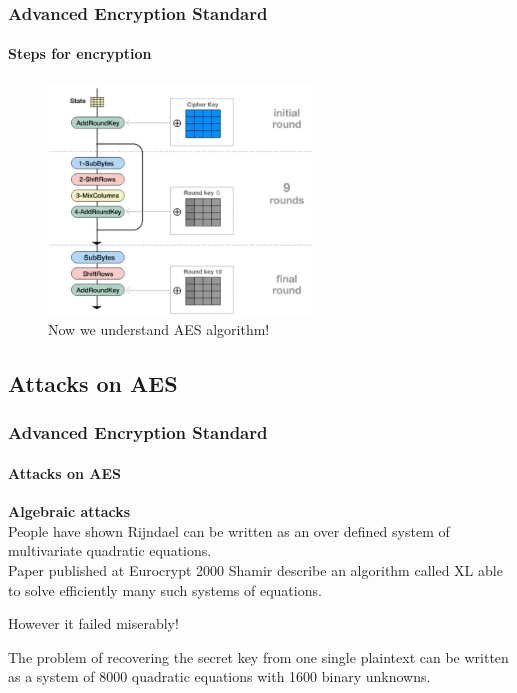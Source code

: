 \begin{frame}
	\frametitle{Advanced Encryption Standard}
		\framesubtitle{Steps for encryption}
		\vspace{-0.2cm}
	\begin{figure}
		\centering
		\includegraphics[width=7cm]{encryption}
		\caption{Now we understand AES algorithm! }
		\label{fig:obrazek encryption}
	\end{figure}
\end{frame}


\subsection{Attacks on AES} 
\begin{frame}
	\frametitle{Advanced Encryption Standard}
		\framesubtitle{Attacks on AES}
		{\normalsize
		\textbf{Algebraic attacks}\\
		\vspace{0.4cm}
		{People have shown Rijndael can be written as an over defined system of multivariate quadratic equations.}\\ 
		{Paper published at Eurocrypt 2000 Shamir describe an algorithm called XL able to solve efficiently many such systems of 					equations.}\\
		\begin{alertblock}{}
		{However it failed miserably!}\\
		\end{alertblock}
		{The problem of recovering the secret key from one single plaintext can be written as a system of 8000 quadratic equations with 1600 binary unknowns.}\\
		}
\end{frame}

